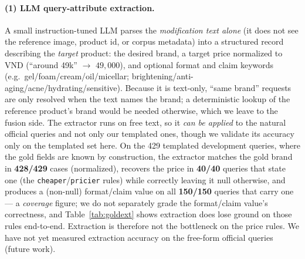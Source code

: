 \documentclass[sigconf,nonacm]{acmart}
\begin{document}
\paragraph{(1) LLM query-attribute extraction.}
A small instruction-tuned LLM parses the \emph{modification text alone}
(it does not see the reference image, product id, or corpus metadata) into a
structured record describing the \emph{target} product: the desired brand, a
target price normalized to VND (``around 49k'' $\to$ $49{,}000$), and
optional format and claim keywords (e.g.\ gel/foam/cream/oil/micellar;
brightening/anti-aging/acne/hydrating/sensitive). Because it is text-only,
``same brand'' requests are only resolved when the text names the brand; a
deterministic lookup of the reference product's brand would be needed
otherwise, which we leave to the fusion side. The extractor runs on free
text, so it \emph{can be applied} to the natural official queries and not
only our templated ones, though we validate its accuracy only on the
templated set here. On the 429 templated development queries, where the gold
fields are known by construction, the extractor matches the gold brand in
\textbf{428/429} cases (normalized), recovers the price in \textbf{40/40}
queries that state one (the \texttt{cheaper}/\texttt{pricier} rules) while
correctly leaving it null otherwise, and produces a (non-null) format/claim
value on all \textbf{150/150} queries that carry one --- a \emph{coverage}
figure; we do not separately grade the format/claim value's correctness, and
Table~\ref{tab:goldext} shows extraction does lose ground on those rules
end-to-end. Extraction is therefore not the bottleneck on the price rules. We have not yet measured extraction accuracy on the
free-form official queries (future work).
\end{document}
